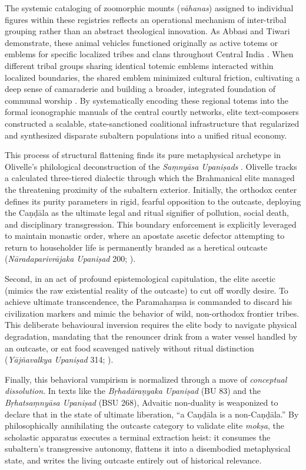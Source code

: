 \documentclass[11pt,twoside,letterpaper]{article}
\begin{document}
The systemic cataloging of zoomorphic mounts (\textit{vāhanas}) assigned to individual figures within these registries reflects an operational mechanism of inter-tribal grouping rather than an abstract theological innovation. As Abbasi and Tiwari demonstrate, these animal vehicles functioned originally as active totems or emblems for specific localized tribes and clans throughout Central India \citep{Abbasi2001}. When different tribal groups sharing identical totemic emblems interacted within localized boundaries, the shared emblem minimized cultural friction, cultivating a deep sense of camaraderie and building a broader, integrated foundation of communal worship \citep{Abbasi2001}. By systematically encoding these regional totems into the formal iconographic manuals of the central courtly networks, elite text-composers constructed a scalable, state-sanctioned coalitional infrastructure that regularized and synthesized disparate subaltern populations into a unified ritual economy.

This process of structural flattening finds its pure metaphysical archetype in Olivelle's philological deconstruction of the \textit{Saṃnyāsa Upaniṣads} \cite{olivelle1992}. Olivelle tracks a calculated three-tiered dialectic through which the Brahmanical elite managed the threatening proximity of the subaltern exterior. Initially, the orthodox center defines its purity parameters in rigid, fearful opposition to the outcaste, deploying the Caṇḍāla as the ultimate legal and ritual signifier of pollution, social death, and disciplinary transgression. This boundary enforcement is explicitly leveraged to maintain monastic order, where an apostate ascetic defector attempting to return to householder life is permanently branded as a heretical outcaste (\textit{Nāradaparivrājaka Upaniṣad} 200; \cite{olivelle1992}).

Second, in an act of profound epistemological capitulation, the elite ascetic (mimics the raw existential reality of the outcaste) to cut off wordly desire. To achieve ultimate transcendence, the Paramahaṃsa is commanded to discard his civilization markers and mimic the behavior of wild, non-orthodox frontier tribes. This deliberate behavioural inversion requires the elite body to navigate physical degradation, mandating that the renouncer drink from a water vessel handled by an outcaste, or eat food scavenged natively without ritual distinction (\textit{Yājñavalkya Upaniṣad} 314; \cite{olivelle1992}).

Finally, this behavioral vampirism is normalized through a move of \textit{conceptual dissolution}. In texts like the \textit{Bṛhadāraṇyaka Upaniṣad} (BU 83) and the \textit{Bṛhatsaṃnyāsa Upaniṣad} (BSU 268), Advaitic non-duality is weaponized to declare that in the state of ultimate liberation, ``a Caṇḍāla is a non-Caṇḍāla.'' By philosophically annihilating the outcaste category to validate elite \textit{mokṣa}, the scholastic apparatus executes a terminal extraction heist: it consumes the subaltern's transgressive autonomy, flattens it into a disembodied metaphysical state, and writes the living outcaste entirely out of historical relevance.
\end{document}
